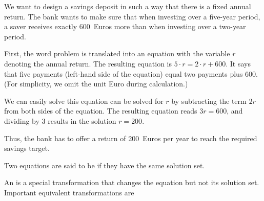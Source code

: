 \begin{MIntro}
\begin{MExample}
  We want to design a savings deposit in such a way that there is a fixed annual return.
  The bank wants to make sure that when investing over a five-year period, a saver
  receives exactly 600~Euros more than when investing over a two-year period. 

  First, the word problem is translated into an equation with the variable $r$ denoting the annual return. The resulting equation is $5\cdot r=2\cdot r+600$. It says that five payments (left-hand side of the equation) equal 
  two payments plus 600. (For simplicity, we omit the unit Euro during calculation.)

  We can easily solve this equation can be solved for $r$ by subtracting the term $2r$ from both sides of the equation. The resulting
  equation reads $3r=600$, and dividing by $3$ results in the solution $r=200$.

  Thus, the bank has to offer a return of 200~Euros per year to reach the required savings target. 
\end{MExample}



\begin{MInfo}
Two equations are said to be  if they have the same solution set.

An  is a special transformation that changes
the equation but not its solution set. Important equivalent transformations are


\end{MInfo}
\end{MIntro}
